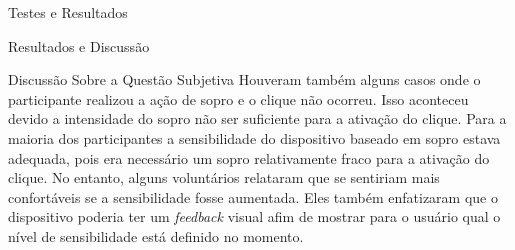 \begin{chapter}{Testes e Resultados}
\begin{section}{Resultados e Discussão}
\begin{subsection}{Discussão Sobre a Questão Subjetiva}
Houveram também alguns casos onde o participante realizou a ação de sopro e o
clique não ocorreu. Isso aconteceu devido a intensidade do sopro não ser
suficiente para a ativação do clique. Para a maioria dos participantes a
sensibilidade do dispositivo baseado em sopro estava adequada, pois era
necessário um sopro relativamente fraco para a ativação do clique. No entanto,
alguns voluntários relataram que se sentiriam mais confortáveis se a
sensibilidade fosse aumentada. %
Eles também enfatizaram que o  dispositivo poderia ter um \textit{feedback}
visual afim de mostrar para o usuário qual o nível de sensibilidade está
definido no momento.


\end{subsection}

\end{section}

\end{chapter}
